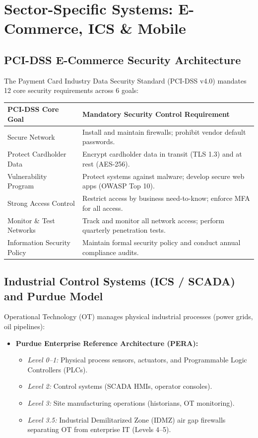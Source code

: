\documentclass[12pt,a4paper]{article}
\renewcommand{\arraystretch}{1.45}
\begin{document}
\section{Sector-Specific Systems: E-Commerce, ICS \& Mobile}

\subsection{PCI-DSS E-Commerce Security Architecture}
The Payment Card Industry Data Security Standard (PCI-DSS v4.0) mandates 12 core security requirements across 6 goals:

{\renewcommand{\arraystretch}{1.45}%
\begin{tabularx}{\linewidth}{|B{4.5cm}|Y|}
\hline
\textbf{PCI-DSS Core Goal} & \textbf{Mandatory Security Control Requirement} \\
\hline
Secure Network & Install and maintain firewalls; prohibit vendor default passwords. \\
\hline
Protect Cardholder Data & Encrypt cardholder data in transit (TLS 1.3) and at rest (AES-256). \\
\hline
Vulnerability Program & Protect systems against malware; develop secure web apps (OWASP Top 10). \\
\hline
Strong Access Control & Restrict access by business need-to-know; enforce MFA for all access. \\
\hline
Monitor \& Test Networks & Track and monitor all network access; perform quarterly penetration tests. \\
\hline
Information Security Policy & Maintain formal security policy and conduct annual compliance audits. \\
\hline
\end{tabularx}}

\subsection{Industrial Control Systems (ICS / SCADA) and Purdue Model}
Operational Technology (OT) manages physical industrial processes (power grids, oil pipelines):
\begin{itemize}[leftmargin=*, itemsep=3pt]
  \item \textbf{Purdue Enterprise Reference Architecture (PERA):}
    \begin{itemize}
      \item \textit{Level 0--1:} Physical process sensors, actuators, and Programmable Logic Controllers (PLCs).
      \item \textit{Level 2:} Control systems (SCADA HMIs, operator consoles).
      \item \textit{Level 3:} Site manufacturing operations (historians, OT monitoring).
      \item \textit{Level 3.5:} Industrial Demilitarized Zone (IDMZ) air gap firewalls separating OT from enterprise IT (Levels 4--5).
    \end{itemize}
\end{itemize}
\end{document}
